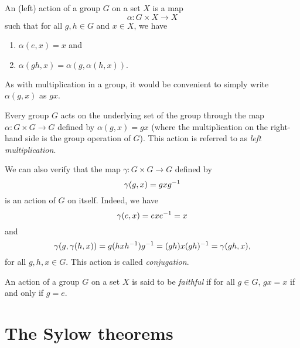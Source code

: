 \begin{definition}
    An (left) action of a group \(G\) on a set \(X\) is a map
    \[
        \alpha: G \times X \to X
    \]
    such that for all \(g, h \in G\) and \(x \in X\), we have
    \begin{enumerate}[label=(\alph*)]
        \item \(\alpha(e, x) = x\) and
        \item \(\alpha(gh, x) = \alpha(g, \alpha(h, x)).\)
    \end{enumerate}

    As with multiplication in a group, it would be convenient to simply write
    \(\alpha(g, x)\) as \(gx\).
\end{definition}

\begin{example}
    Every group \(G\) acts on the underlying set of the group through the map
    \(\alpha: G \times G \to G\) defined by \(\alpha(g, x) = gx\) (where the
    multiplication on the right-hand side is the group operation of \(G\)). This
    action is referred to as \emph{left multiplication}.

    We can also verify that the map \(\gamma: G \times G \to G\) defined by
    \[
        \gamma(g, x) = gxg^{-1}
    \]
    is an action of \(G\) on itself. Indeed, we have
    \[
        \gamma(e, x) = exe^{-1} = x
    \]
    and
    \[
        \gamma(g, \gamma(h, x)) = g(hxh^{-1})g^{-1} = (gh)x(gh)^{-1} = \gamma(gh, x),
    \]
    for all \(g, h, x \in G\). This action is called \emph{conjugation}.
\end{example}

\begin{sectionthm}
    An action of a group \(G\) on a set \(X\) is said to be \emph{faithful} if
    for all \(g \in G\), \(gx = x\) if and only if \(g = e\).
\end{sectionthm}

\section{The Sylow theorems}